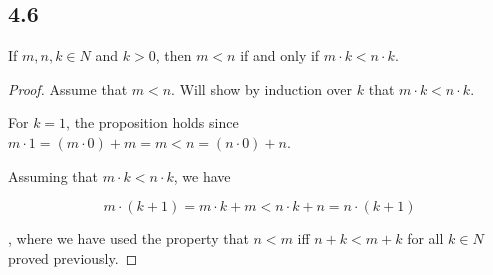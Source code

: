 \subsection*{4.6} If $m, n, k \in N$ and $k > 0$, then $m < n$ if and only if $m \cdot k < n \cdot k$.

\begin{proof}
Assume that $m < n$. Will show by induction over $k$ that $m \cdot k < n \cdot k$.

For $k=1$, the proposition holds since $m \cdot 1 = (m \cdot 0) + m = m < n = (n \cdot 0) + n$.

Assuming that $m \cdot k < n \cdot k$, we have

$$m \cdot (k+1) = m \cdot k + m < n \cdot k + n = n \cdot (k+1)$$

, where we have used the property that $n < m$ iff $n + k < m + k$ for all $k \in N$ proved previously.

\end{proof}

